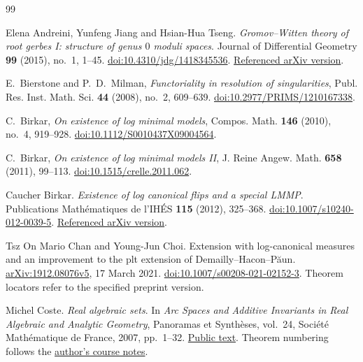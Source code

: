 \begin{thebibliography}{99}
\raggedright

Elena Andreini, Yunfeng Jiang and Hsian-Hua Tseng.
\newblock \emph{{Gromov--Witten} theory of root gerbes {I}: structure of genus \(0\) moduli spaces}.
\newblock Journal of Differential Geometry \textbf{99} (2015), no.~1, 1--45.
\newblock \href{https://doi.org/10.4310/jdg/1418345536}{doi:10.4310/jdg/1418345536}.
\newblock \href{https://arxiv.org/abs/0907.2087}{Referenced arXiv version}.

E.~Bierstone and P.~D.~Milman,
\emph{Functoriality in resolution of singularities},
Publ. Res. Inst. Math. Sci. \textbf{44} (2008), no.~2, 609--639.
\href{https://doi.org/10.2977/PRIMS/1210167338}{doi:10.2977/PRIMS/1210167338}.

C.~Birkar,
\emph{On existence of log minimal models},
Compos. Math. \textbf{146} (2010), no.~4, 919--928.
\href{https://doi.org/10.1112/S0010437X09004564}{doi:10.1112/S0010437X09004564}.

C.~Birkar,
\emph{On existence of log minimal models II},
J. Reine Angew. Math. \textbf{658} (2011), 99--113.
\href{https://doi.org/10.1515/crelle.2011.062}{doi:10.1515/crelle.2011.062}.

Caucher Birkar.
\newblock \emph{Existence of log canonical flips and a special {LMMP}}.
\newblock Publications Math{\'e}matiques de l'IH{\'E}S \textbf{115} (2012), 325--368.
\newblock \href{https://doi.org/10.1007/s10240-012-0039-5}{doi:10.1007/s10240-012-0039-5}.
\newblock \href{https://arxiv.org/abs/1104.4981v3}{Referenced arXiv version}.

Tsz On Mario Chan and Young-Jun Choi.
\newblock Extension with log-canonical measures and an improvement to
the plt extension of Demailly--Hacon--P\u{a}un.
\newblock \href{https://arxiv.org/abs/1912.08076v5}{arXiv:1912.08076v5}, 17 March 2021.
\newblock \href{https://doi.org/10.1007/s00208-021-02152-3}{doi:10.1007/s00208-021-02152-3}.
Theorem locators refer to the specified preprint version.

Michel Coste.
\newblock \emph{Real algebraic sets}.
\newblock In \emph{Arc Spaces and Additive Invariants in Real Algebraic and Analytic Geometry}, Panoramas et Synth{\`e}ses, vol.~24, Soci{\'e}t{\'e} Math{\'e}matique de France, 2007, pp.~1--32.
\newblock \href{https://perso.univ-rennes1.fr/michel.coste/polyens/RASroot.pdf}{Public text}.
\newblock Theorem numbering follows the \href{https://perso.univ-rennes1.fr/michel.coste/polyens/RASroot.pdf}{author's course notes}.


\end{thebibliography}
